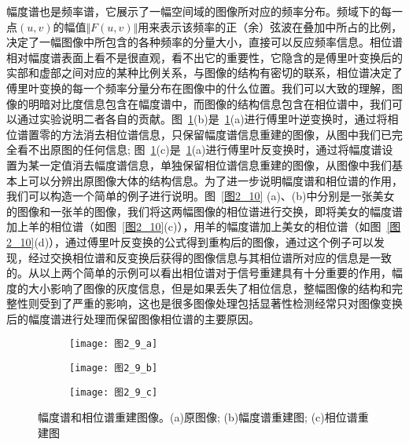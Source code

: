 幅度谱也是频率谱，它展示了一幅空间域的图像所对应的频率分布。频域下的每一点$(u,v)$的幅值$\Vert F(u,v)\Vert$用来表示该频率的正（余）弦波在叠加中所占的比例，决定了一幅图像中所包含的各种频率的分量大小，直接可以反应频率信息。相位谱相对幅度谱表面上看不是很直观，看不出它的重要性，它隐含的是傅里叶变换后的实部和虚部之间对应的某种比例关系，与图像的结构有密切的联系，相位谱决定了傅里叶变换的每一个频率分量分布在图像中的什么位置。我们可以大致的理解，图像的明暗对比度信息包含在幅度谱中，而图像的结构信息包含在相位谱中，我们可以通过实验说明二者各自的贡献。图~\ref{图2_9}(b)是~\ref{图2_9}(a)进行傅里叶逆变换时，通过将相位谱置零的方法消去相位谱信息，只保留幅度谱信息重建的图像，从图中我们已完全看不出原图的任何信息; 图~\ref{图2_9}(c)是~\ref{图2_9}(a)进行傅里叶反变换时，通过将幅度谱设置为某一定值消去幅度谱信息，单独保留相位谱信息重建的图像，从图像中我们基本上可以分辨出原图像大体的结构信息。为了进一步说明幅度谱和相位谱的作用，我们可以构造一个简单的例子进行说明。图~\ref{图2_10} (a)、(b)中分别是一张美女的图像和一张羊的图像，我们将这两幅图像的相位谱进行交换，即将美女的幅度谱加上羊的相位谱（如图~\ref{图2_10}(c)），用羊的幅度谱加上美女的相位谱（如图~\ref{图2_10}(d)），通过傅里叶反变换的公式得到重构后的图像，通过这个例子可以发现，经过交换相位谱和反变换后获得的图像信息与其相位谱所对应的信息是一致的。从以上两个简单的示例可以看出相位谱对于信号重建具有十分重要的作用，幅度的大小影响了图像的灰度信息，但是如果丢失了相位信息，整幅图像的结构和完整性则受到了严重的影响，这也是很多图像处理包括显著性检测经常只对图像变换后的幅度谱进行处理而保留图像相位谱的主要原因。
\begin{figure}[h]
  \centering%
  \begin{subfigure}{3cm}
    \texttt{[image: 图2\_9\_a]}
    \caption{}
  \end{subfigure}
  \hspace{4em}%
  \begin{subfigure}{0.2\textwidth}
    \texttt{[image: 图2\_9\_b]}
    \caption{}
  \end{subfigure}
  \hspace{4em}%
  \begin{subfigure}{0.25\textwidth}
    \texttt{[image: 图2\_9\_c]}
    \caption{}
  \end{subfigure}
  \caption{幅度谱和相位谱重建图像。(a)原图像; (b)幅度谱重建图; (c)相位谱重建图}
  \label{图2_9}
\end{figure}
